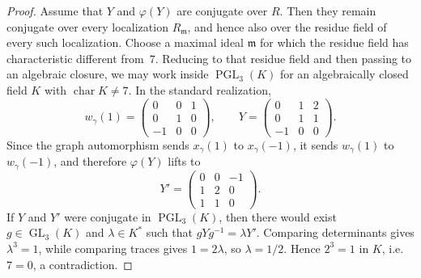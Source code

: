 \documentclass[10pt,a4paper]{amsart}
\DeclareMathOperator{\GL}{GL}
\DeclareMathOperator{\PGL}{PGL}
\DeclareMathOperator{\charr}{char}
\begin{document}
\begin{proof}
Assume that $Y$ and $\varphi(Y)$ are conjugate over $R$.
Then they remain conjugate over every localization $R_{\mathfrak m}$, and hence also over the residue field of every such localization.
Choose a maximal ideal $\mathfrak m$ for which the residue field has characteristic different from~$7$.
Reducing to that residue field and then passing to an algebraic closure, we may work inside $\PGL_3(K)$ for an algebraically closed field $K$ with $\charr K\ne 7$.
In the standard realization,
\[
w_\gamma(1)=
\begin{pmatrix}
0 & 0 & 1\\
0 & 1 & 0\\
-1& 0 & 0
\end{pmatrix},
\qquad
Y=
\begin{pmatrix}
0 & 1 & 2\\
0 & 1 & 1\\
-1& 0 & 0
\end{pmatrix}.
\]
Since the graph automorphism sends $x_\gamma(1)$ to $x_\gamma(-1)$, it sends $w_\gamma(1)$ to $w_\gamma(-1)$, and therefore $\varphi(Y)$ lifts to
\[
Y'=
\begin{pmatrix}
0 & 0 & -1\\
1 & 2 & 0\\
1 & 1 & 0
\end{pmatrix}.
\]
If $Y$ and $Y'$ were conjugate in $\PGL_3(K)$, then there would exist $g\in \GL_3(K)$ and $\lambda\in K^*$ such that $gYg^{-1}=\lambda Y'$.
Comparing determinants gives $\lambda^3=1$, while comparing traces gives $1=2\lambda$, so $\lambda=1/2$.
Hence $2^3=1$ in $K$, i.e. $7=0$, a contradiction.
\end{proof}
\end{document}

